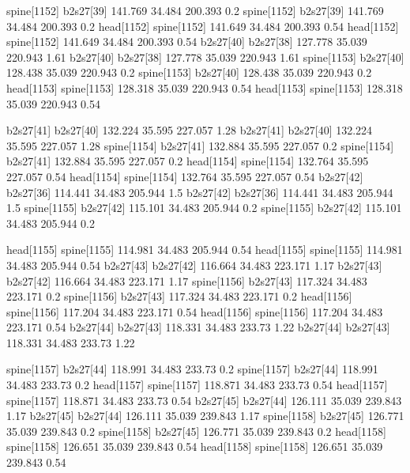 spine[1152]    b2s27[39]    141.769    34.484    200.393    0.2
spine[1152]    b2s27[39]    141.769    34.484    200.393    0.2
head[1152]    spine[1152]    141.649    34.484    200.393    0.54
head[1152]    spine[1152]    141.649    34.484    200.393    0.54
b2s27[40]    b2s27[38]    127.778    35.039    220.943    1.61
b2s27[40]    b2s27[38]    127.778    35.039    220.943    1.61
spine[1153]    b2s27[40]    128.438    35.039    220.943    0.2
spine[1153]    b2s27[40]    128.438    35.039    220.943    0.2
head[1153]    spine[1153]    128.318    35.039    220.943    0.54
head[1153]    spine[1153]    128.318    35.039    220.943    0.54


b2s27[41]    b2s27[40]    132.224    35.595    227.057    1.28
b2s27[41]    b2s27[40]    132.224    35.595    227.057    1.28
spine[1154]    b2s27[41]    132.884    35.595    227.057    0.2
spine[1154]    b2s27[41]    132.884    35.595    227.057    0.2
head[1154]    spine[1154]    132.764    35.595    227.057    0.54
head[1154]    spine[1154]    132.764    35.595    227.057    0.54
b2s27[42]    b2s27[36]    114.441    34.483    205.944    1.5
b2s27[42]    b2s27[36]    114.441    34.483    205.944    1.5
spine[1155]    b2s27[42]    115.101    34.483    205.944    0.2
spine[1155]    b2s27[42]    115.101    34.483    205.944    0.2


head[1155]    spine[1155]    114.981    34.483    205.944    0.54
head[1155]    spine[1155]    114.981    34.483    205.944    0.54
b2s27[43]    b2s27[42]    116.664    34.483    223.171    1.17
b2s27[43]    b2s27[42]    116.664    34.483    223.171    1.17
spine[1156]    b2s27[43]    117.324    34.483    223.171    0.2
spine[1156]    b2s27[43]    117.324    34.483    223.171    0.2
head[1156]    spine[1156]    117.204    34.483    223.171    0.54
head[1156]    spine[1156]    117.204    34.483    223.171    0.54
b2s27[44]    b2s27[43]    118.331    34.483    233.73    1.22
b2s27[44]    b2s27[43]    118.331    34.483    233.73    1.22


spine[1157]    b2s27[44]    118.991    34.483    233.73    0.2
spine[1157]    b2s27[44]    118.991    34.483    233.73    0.2
head[1157]    spine[1157]    118.871    34.483    233.73    0.54
head[1157]    spine[1157]    118.871    34.483    233.73    0.54
b2s27[45]    b2s27[44]    126.111    35.039    239.843    1.17
b2s27[45]    b2s27[44]    126.111    35.039    239.843    1.17
spine[1158]    b2s27[45]    126.771    35.039    239.843    0.2
spine[1158]    b2s27[45]    126.771    35.039    239.843    0.2
head[1158]    spine[1158]    126.651    35.039    239.843    0.54
head[1158]    spine[1158]    126.651    35.039    239.843    0.54


